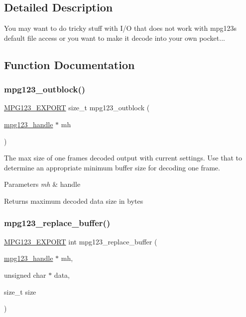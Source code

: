 \subsection{Detailed Description}
You may want to do tricky stuff with I/O that does not work with mpg123\textquotesingle{}s default file access or you want to make it decode into your own pocket... 

\subsection{Function Documentation}
\mbox{\label{group__mpg123__lowio_ga00c0874bdad4a3f6366a035694f298d6}} 
\subsubsection{\texorpdfstring{mpg123\_outblock()}{mpg123\_outblock()}}
{\footnotesize\ttfamily \mbox{\hyperlink{mpg123_8h_a2ba98cfba3f760879df70e755b2a61cc}{M\+P\+G123\+\_\+\+E\+X\+P\+O\+RT}} size\+\_\+t mpg123\+\_\+outblock (\begin{DoxyParamCaption}\item[{\mbox{\hyperlink{group__mpg123__init_ga6728e2839a395f3a07d4514da659faca}{mpg123\+\_\+handle}} $\ast$}]{mh }\end{DoxyParamCaption})}

The max size of one frame\textquotesingle{}s decoded output with current settings. Use that to determine an appropriate minimum buffer size for decoding one frame. 
\begin{DoxyParams}{Parameters}
{\em mh} & handle \\
\hline
\end{DoxyParams}
\begin{DoxyReturn}{Returns}
maximum decoded data size in bytes 
\end{DoxyReturn}
\mbox{\label{group__mpg123__lowio_gaaae8cfb0de3a2bc1dc97d916aa519772}} 
\subsubsection{\texorpdfstring{mpg123\_replace\_buffer()}{mpg123\_replace\_buffer()}}
{\footnotesize\ttfamily \mbox{\hyperlink{mpg123_8h_a2ba98cfba3f760879df70e755b2a61cc}{M\+P\+G123\+\_\+\+E\+X\+P\+O\+RT}} int mpg123\+\_\+replace\+\_\+buffer (\begin{DoxyParamCaption}\item[{\mbox{\hyperlink{group__mpg123__init_ga6728e2839a395f3a07d4514da659faca}{mpg123\+\_\+handle}} $\ast$}]{mh,  }\item[{unsigned char $\ast$}]{data,  }\item[{size\+\_\+t}]{size }\end{DoxyParamCaption})}


